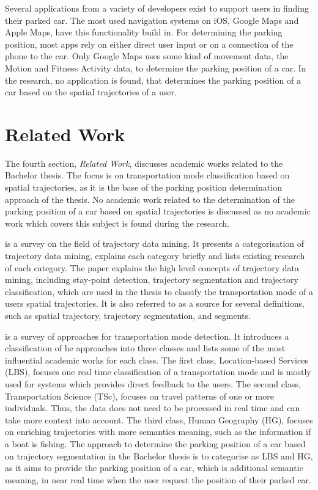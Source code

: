 Several applications from a variety of developers exist to support users in finding their parked car. The most used navigation systems on iOS, Google Maps and Apple Maps, have this functionality build in. For determining the parking position, most apps rely on either direct user input or on a connection of the phone to the car. Only Google Maps uses some kind of movement data, the Motion and Fitness Activity data, to determine the parking position of a car. In the research, no application is found, that determines the parking position of a car based on the spatial trajectories of a user.


\section{Related Work}
The fourth section, \textit{Related Work}, discusses academic works related to the Bachelor thesis. The focus is on transportation mode classification based on spatial trajectories, as it is the base of the parking position determination approach of the thesis. No academic work related to the determination of the parking position of a car based on spatial trajectories is discussed as no academic work which covers this subject is found during the research.

\cite{Zheng:2015:TDM:2764959.2743025} is a survey on the field of trajectory data mining. It presents a categorisation of trajectory data mining, explains each category briefly and lists existing research of each category.\newline
The paper explains the high level concepts of trajectory data mining, including stay-point detection, trajectory segmentation and trajectory classification, which are used in the thesis to classify the transportation mode of a users spatial trajectories. It is also referred to as a source for several definitions, such as spatial trajectory, trajectory segmentation, and segments.

\cite{Prelipcean2017} is a survey of approaches for transportation mode detection. It introduces a classification of he approaches into three classes and lists some of the most influential academic works for each class. The first class, Location-based Services (LBS), focuses one real time classification of a transportation mode and is mostly used for systems which provides direct feedback to the users. The second class, Transportation Science (TSc), focuses on travel patterns of one or more individuals. Thus, the data does not need to be processed in real time and can take more context into account. The third class, Human Geography (HG), focuses on enriching trajectories with more semantics meaning, such as the information if a boat is fishing.\newline
The approach to determine the parking position of a car based on trajectory segmentation in the Bachelor thesis is to categorise as LBS and HG, as it aims to provide the parking position of a car, which is additional semantic meaning, in near real time when the user request the position of their parked car. 

